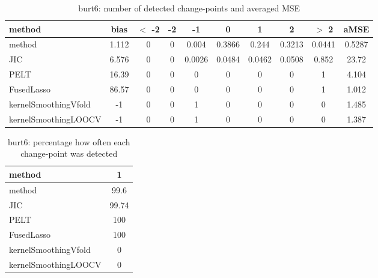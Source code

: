 \begin{table}[ht]
\centering
\begin{tabular}{l|c|ccccccc|c}
  \hline
method & bias & $<$ -2 & -2 & -1 & 0 & 1 & 2 & $>$ 2 & aMSE \\ 
  \hline
method & 1.112 &     0 &     0 & 0.004 & 0.3866 & 0.244 & 0.3213 & 0.0441 & 0.5287 \\ 
  JIC & 6.576 &     0 &     0 & 0.0026 & 0.0484 & 0.0462 & 0.0508 & 0.852 & 23.72 \\ 
  PELT & 16.39 &     0 &     0 &     0 &     0 &     0 &     0 &     1 & 4.104 \\ 
  FusedLasso & 86.57 &     0 &     0 &     0 &     0 &     0 &     0 &     1 & 1.012 \\ 
  kernelSmoothingVfold &    -1 &     0 &     0 &     1 &     0 &     0 &     0 &     0 & 1.485 \\ 
  kernelSmoothingLOOCV &    -1 &     0 &     0 &     1 &     0 &     0 &     0 &     0 & 1.387 \\ 
   \hline
\end{tabular}
\caption{burt6: number of detected change-points and averaged MSE} 
\label{tab:burt6Njumps}
\end{table}
\begin{table}[ht]
\centering
\begin{tabular}{l|c}
  \hline
method & 1 \\ 
  \hline
method &   99.6 \\ 
  JIC &  99.74 \\ 
  PELT &    100 \\ 
  FusedLasso &    100 \\ 
  kernelSmoothingVfold &      0 \\ 
  kernelSmoothingLOOCV &      0 \\ 
   \hline
\end{tabular}
\caption{burt6: percentage how often each change-point was detected} 
\label{tab:burt6Detections}
\end{table}
